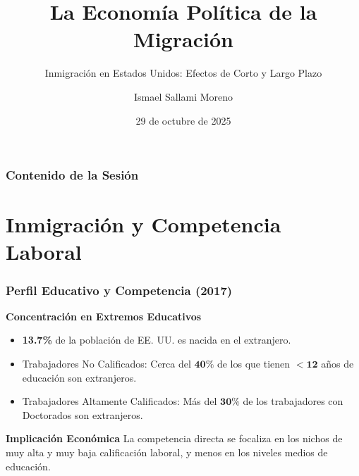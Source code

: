\documentclass{beamer}
\title{La Economía Política de la Migración}
\subtitle{Inmigración en Estados Unidos: Efectos de Corto y Largo Plazo}
\author{Ismael Sallami Moreno}
\institute{UGR}
\date{29 de octubre de 2025}
\begin{document}
\begin{frame}
\titlepage
\end{frame}

\begin{frame}
\frametitle{Contenido de la Sesión}
\tableofcontents %
\end{frame}

\section{Inmigración y Competencia Laboral}

\begin{frame}
\frametitle{Perfil Educativo y Competencia (2017)}
\begin{block}{\textbf{Concentración en Extremos Educativos}}
\begin{itemize}
\item \textbf{13.7\%} de la población de EE. UU. es nacida en el extranjero.
\item \alert{Trabajadores No Calificados:} Cerca del $\mathbf{40\%}$ de los que tienen $\mathbf{< 12}$ años de educación son extranjeros.
\item \alert{Trabajadores Altamente Calificados:} Más del $\mathbf{30\%}$ de los trabajadores con Doctorados son extranjeros.
\end{itemize}
\vfill
\end{block}

\begin{alertblock}{\textbf{Implicación Económica}}
La competencia directa se focaliza en los nichos de muy alta y muy baja calificación laboral, y menos en los niveles medios de educación.
\end{alertblock}
\end{frame}
\end{document}
